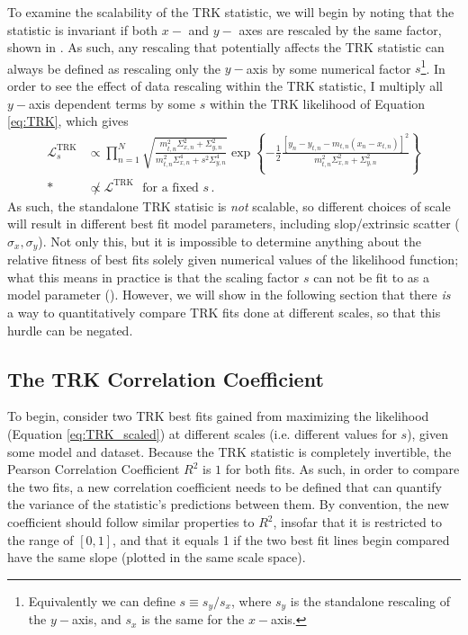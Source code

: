 To examine the scalability of the TRK statistic, we will begin by noting that the statistic is invariant if both $x-$ and $y-$ axes are rescaled by the same factor, shown in \textcite{trotter}. As such, any rescaling that potentially affects the TRK statistic can always be defined as rescaling only the $y-$axis by some numerical factor $s$\footnote{Equivalently we can define $s\equiv s_y/s_x$, where $s_y$ is the standalone rescaling of the $y-$axis, and $s_x$ is the same for the $x-$axis.}. In order to see the effect of data rescaling within the TRK statistic, I multiply all $y-$axis dependent terms by some $s$ within the TRK likelihood of Equation \eqref{eq:TRK}, which gives
\begin{align}\label{eq:TRK_scaled}
\mathcal{L}_s^{\mathrm {TRK}} & \propto \prod_{n=1}^N{ \sqrt{\frac{m_{t,n}^2\Sigma_{x,n}^2+\Sigma_{y,n}^2}{m_{t,n}^2\Sigma_{x,n}^4+s^2\Sigma_{y,n}^4}}\exp\left\{-\frac{1}{2}\frac{\left[y_n-y_{t,n}-m_{t,n}(x_n-x_{t,n})\right]^2}{m_{t,n}^2\Sigma_{x,n}^2+\Sigma_{y,n}^2}\right\}} \nonumber \\*
& \not\propto \mathcal{L}^{\mathrm {TRK}} \mbox{~~for a fixed $s$}\, .
\end{align}
As such, the standalone TRK statisic is \textit{not} scalable, so different choices of scale will result in different best fit model parameters, including slop/extrinsic scatter ($\sigma_x,\sigma_y$). Not only this, but it is impossible to determine anything about the relative fitness of best fits solely given numerical values of the likelihood function; what this means in practice is that the scaling factor $s$ can not be fit to as a model parameter (\textcite{trotter}). However, we will show in the following section that there \textit{is} a way to quantitatively compare TRK fits done at different scales, so that this hurdle can be negated.

\subsection{The TRK Correlation Coefficient}
\label{sec:TRKcorr}
To begin, consider two TRK best fits gained from maximizing the likelihood (Equation \eqref{eq:TRK_scaled}) at different scales (i.e. different values for $s$), given some model and dataset. Because the TRK statistic is completely invertible, the Pearson Correlation Coefficient $R^2$ is $1$ for both fits. As such, in order to compare the two fits,  a new correlation coefficient needs to be defined that can quantify the variance of the statistic's predictions between them. By convention, the new coefficient should follow similar properties to $R^2$, insofar that it is restricted to the range of $[0,1]$, and that it equals 1 if the two best fit lines begin compared have the same slope (plotted in the same scale space).

